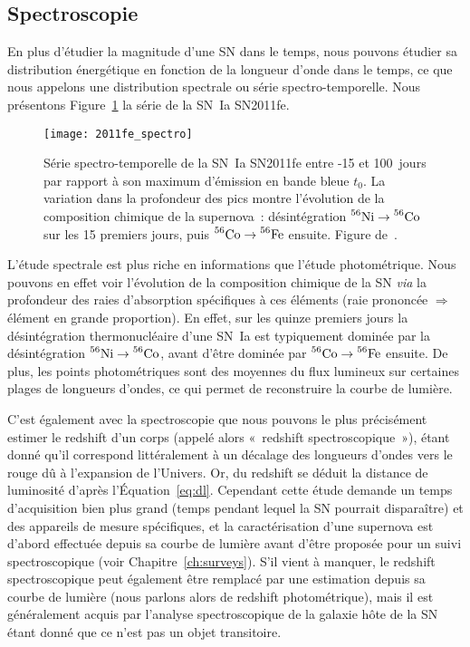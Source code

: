 \documentclass[../main/main.tex]{subfiles}
\begin{document}
\subsection{Spectroscopie}\label{ssec:spectro}

En plus d'étudier la magnitude d'une SN dans le temps, nous pouvons étudier sa
distribution énergétique en fonction de la longueur d'onde dans le temps, ce
que nous appelons une distribution spectrale ou série spectro-temporelle. Nous
présentons Figure~\ref{fig:2011fe_spec} la série de la SN~Ia SN2011fe.

\begin{figure}[]
    \centering
    \texttt{[image: 2011fe\_spectro]}
    \caption[Série spectro-temporelle de la SN~Ia SN2011fe]{Série
        spectro-temporelle de la SN~Ia SN2011fe entre -15 et \SI{100}{jours} par
        rapport à son maximum d'émission en bande bleue $t_0$. La variation dans
        la profondeur des pics montre l'évolution de la composition chimique de
        la supernova~: désintégration $\prescript{56}{}{\mathrm{Ni}}
        \rightarrow \prescript{56}{}{\mathrm{Co}}$ sur les 15 premiers jours,
        puis $ \prescript{56}{}{\mathrm{Co}} \rightarrow
        \prescript{56}{}{\mathrm{Fe}}$ ensuite. Figure de~\cite{pereira2013}.}
        \label{fig:2011fe_spec}
\end{figure}

L'étude spectrale est plus riche en informations que l'étude photométrique. Nous
pouvons en effet voir l'évolution de la composition chimique de la SN
\textit{via} la profondeur des raies d'absorption spécifiques à ces éléments
(raie prononcée $\Rightarrow$ élément en grande proportion). En effet, sur les
quinze premiers jours la désintégration thermonucléaire d'une SN~Ia est
typiquement dominée par la désintégration $\prescript{56}{}{\mathrm{Ni}}
\rightarrow \prescript{56}{}{\mathrm{Co}}$, avant d'être dominée par 
$\prescript{56}{}{\mathrm{Co}} \rightarrow \prescript{56}{}{\mathrm{Fe}}$
ensuite. De plus, les points photométriques sont des moyennes du flux lumineux
sur certaines plages de longueurs d'ondes, ce qui permet de reconstruire la
courbe de lumière.

C'est également avec la spectroscopie que nous pouvons le plus précisément
estimer le redshift d'un corps (appelé alors «~redshift spectroscopique~»),
étant donné qu'il correspond littéralement à un décalage des longueurs d'ondes
vers le rouge dû à l'expansion de l'Univers. Or, du redshift se déduit la
distance de luminosité d'après l'Équation~\ref{eq:dl}. Cependant cette étude
demande un temps d'acquisition bien plus grand (temps pendant lequel la SN
pourrait disparaître) et des appareils de mesure spécifiques, et la
caractérisation d'une supernova est d'abord effectuée depuis sa courbe de
lumière avant d'être proposée pour un suivi spectroscopique (voir
Chapitre~\ref{ch:surveys}). S'il vient à manquer, le redshift spectroscopique
peut également être remplacé par une estimation depuis sa courbe de lumière
(nous parlons alors de redshift photométrique), mais il est généralement acquis
par l'analyse spectroscopique de la galaxie hôte de la SN étant donné que ce
n'est pas un objet transitoire.
\end{document}
